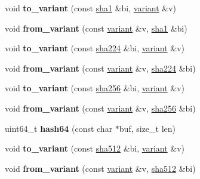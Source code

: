 \begin{DoxyCompactItemize}
void {\bfseries to\+\_\+variant} (const \mbox{\hyperlink{classfc_1_1sha1}{sha1}} \&bi, \mbox{\hyperlink{classfc_1_1variant}{variant}} \&v)
\item 
\mbox{\label{namespacefc_a44ad4b9aef689cc656d4e404b3f481c4}} 
void {\bfseries from\+\_\+variant} (const \mbox{\hyperlink{classfc_1_1variant}{variant}} \&v, \mbox{\hyperlink{classfc_1_1sha1}{sha1}} \&bi)
\item 
\mbox{\label{namespacefc_ae2206e6583eebd571c0dccbc582e9926}} 
void {\bfseries to\+\_\+variant} (const \mbox{\hyperlink{classfc_1_1sha224}{sha224}} \&bi, \mbox{\hyperlink{classfc_1_1variant}{variant}} \&v)
\item 
\mbox{\label{namespacefc_ae868229a5d2d2893b709b926b9844d3a}} 
void {\bfseries from\+\_\+variant} (const \mbox{\hyperlink{classfc_1_1variant}{variant}} \&v, \mbox{\hyperlink{classfc_1_1sha224}{sha224}} \&bi)
\item 
\mbox{\label{namespacefc_a58f154500550bbbbd391b2b16e2c6a10}} 
void {\bfseries to\+\_\+variant} (const \mbox{\hyperlink{classfc_1_1sha256}{sha256}} \&bi, \mbox{\hyperlink{classfc_1_1variant}{variant}} \&v)
\item 
\mbox{\label{namespacefc_a22d8e68070366c9ad47fd0f4dd2fa88f}} 
void {\bfseries from\+\_\+variant} (const \mbox{\hyperlink{classfc_1_1variant}{variant}} \&v, \mbox{\hyperlink{classfc_1_1sha256}{sha256}} \&bi)
\item 
\mbox{\label{namespacefc_ab0d2b10635cac0262ef1395506c3e4f0}} 
uint64\+\_\+t {\bfseries hash64} (const char $\ast$buf, size\+\_\+t len)
\item 
\mbox{\label{namespacefc_a5cf5a73cc55db24f8b05af40eee87dc6}} 
void {\bfseries to\+\_\+variant} (const \mbox{\hyperlink{classfc_1_1sha512}{sha512}} \&bi, \mbox{\hyperlink{classfc_1_1variant}{variant}} \&v)
\item 
\mbox{\label{namespacefc_aa569306ca24dda3b9ef4662149a3dd05}} 
void {\bfseries from\+\_\+variant} (const \mbox{\hyperlink{classfc_1_1variant}{variant}} \&v, \mbox{\hyperlink{classfc_1_1sha512}{sha512}} \&bi)
\item 

\end{DoxyCompactItemize}
